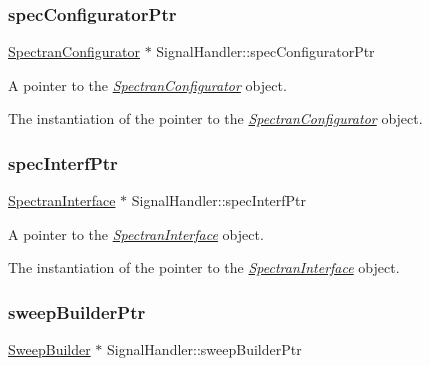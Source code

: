 \subsubsection{\texorpdfstring{spec\+Configurator\+Ptr}{specConfiguratorPtr}}
{\footnotesize\ttfamily \hyperlink{classSpectranConfigurator}{Spectran\+Configurator} $\ast$ Signal\+Handler\+::spec\+Configurator\+Ptr\hspace{0.3cm}{\ttfamily [static]}}



A pointer to the {\itshape \hyperlink{classSpectranConfigurator}{Spectran\+Configurator}} object. 

The instantiation of the pointer to the {\itshape \hyperlink{classSpectranConfigurator}{Spectran\+Configurator}} object. \mbox{\label{classSignalHandler_a855d0b79fcbacf50e4a1d12bd5d1bf53}} 
\subsubsection{\texorpdfstring{spec\+Interf\+Ptr}{specInterfPtr}}
{\footnotesize\ttfamily \hyperlink{classSpectranInterface}{Spectran\+Interface} $\ast$ Signal\+Handler\+::spec\+Interf\+Ptr\hspace{0.3cm}{\ttfamily [static]}}



A pointer to the {\itshape \hyperlink{classSpectranInterface}{Spectran\+Interface}} object. 

The instantiation of the pointer to the {\itshape \hyperlink{classSpectranInterface}{Spectran\+Interface}} object. \mbox{\label{classSignalHandler_a23ec28699521fb435a5eb90f2c36bccb}} 
\subsubsection{\texorpdfstring{sweep\+Builder\+Ptr}{sweepBuilderPtr}}
{\footnotesize\ttfamily \hyperlink{classSweepBuilder}{Sweep\+Builder} $\ast$ Signal\+Handler\+::sweep\+Builder\+Ptr\hspace{0.3cm}{\ttfamily [static]}}



